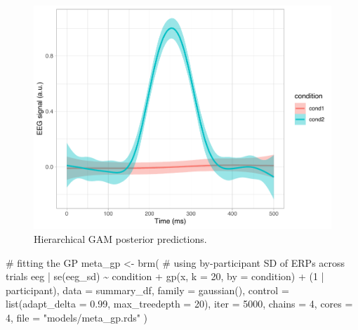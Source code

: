 \documentclass[
  doc,
  floatsintext,
  longtable,
  a4paper,
  nolmodern,
  notxfonts,
  notimes,
  colorlinks=true,linkcolor=blue,citecolor=blue,urlcolor=blue]{apa7}
\newenvironment{Shaded}{\begin{snugshade}}{\end{snugshade}}
\newcommand{\AttributeTok}[1]{\textcolor[rgb]{0.40,0.45,0.13}{#1}}
\newcommand{\CommentTok}[1]{\textcolor[rgb]{0.37,0.37,0.37}{#1}}
\newcommand{\DecValTok}[1]{\textcolor[rgb]{0.68,0.00,0.00}{#1}}
\newcommand{\FloatTok}[1]{\textcolor[rgb]{0.68,0.00,0.00}{#1}}
\newcommand{\FunctionTok}[1]{\textcolor[rgb]{0.28,0.35,0.67}{#1}}
\newcommand{\NormalTok}[1]{\textcolor[rgb]{0.00,0.23,0.31}{#1}}
\newcommand{\OtherTok}[1]{\textcolor[rgb]{0.00,0.23,0.31}{#1}}
\newcommand{\SpecialCharTok}[1]{\textcolor[rgb]{0.37,0.37,0.37}{#1}}
\newcommand{\StringTok}[1]{\textcolor[rgb]{0.13,0.47,0.30}{#1}}
\begin{document}
\begin{figure}[H]

\caption{Hierarchical GAM posterior predictions.}

{\centering \includegraphics[width=1\textwidth,height=\textheight]{brms_meeg_files/figure-pdf/meta-gam-preds-1.pdf}

}

\end{figure}%

\begin{Shaded}
\begin{Highlighting}[]
\CommentTok{\# fitting the GP}
\NormalTok{meta\_gp }\OtherTok{\textless{}{-}} \FunctionTok{brm}\NormalTok{(}
    \CommentTok{\# using by{-}participant SD of ERPs across trials}
\NormalTok{    eeg }\SpecialCharTok{|} \FunctionTok{se}\NormalTok{(eeg\_sd) }\SpecialCharTok{\textasciitilde{}}
\NormalTok{        condition }\SpecialCharTok{+} \FunctionTok{gp}\NormalTok{(x, }\AttributeTok{k =} \DecValTok{20}\NormalTok{, }\AttributeTok{by =}\NormalTok{ condition) }\SpecialCharTok{+}
\NormalTok{        (}\DecValTok{1} \SpecialCharTok{|}\NormalTok{ participant),}
    \AttributeTok{data =}\NormalTok{ summary\_df,}
    \AttributeTok{family =} \FunctionTok{gaussian}\NormalTok{(),}
    \AttributeTok{control =} \FunctionTok{list}\NormalTok{(}\AttributeTok{adapt\_delta =} \FloatTok{0.99}\NormalTok{, }\AttributeTok{max\_treedepth =} \DecValTok{20}\NormalTok{),}
    \AttributeTok{iter =} \DecValTok{5000}\NormalTok{,}
    \AttributeTok{chains =} \DecValTok{4}\NormalTok{,}
    \AttributeTok{cores =} \DecValTok{4}\NormalTok{,}
    \AttributeTok{file =} \StringTok{"models/meta\_gp.rds"}
\NormalTok{    )}
\end{Highlighting}
\end{Shaded}
\end{document}

